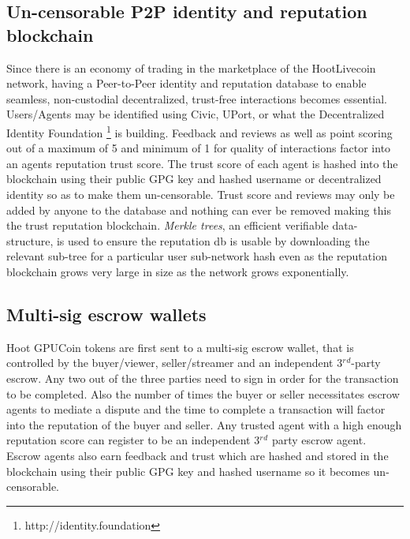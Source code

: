 \documentclass{article}
\begin{document}
\subsection{Un-censorable P2P identity and reputation blockchain}
Since there is an economy of trading in the marketplace of the HootLivecoin network, having a Peer-to-Peer identity and reputation database to enable seamless, non-custodial decentralized, trust-free interactions becomes essential. Users/Agents may be identified using Civic, UPort, or what the Decentralized Identity Foundation \footnote{http://identity.foundation} is building. Feedback and reviews as well as point scoring out of a maximum of 5 and minimum of 1 for quality of interactions factor into an agents reputation trust score. The trust score of each agent is hashed into the blockchain using their public GPG key and hashed username or decentralized identity so as to make them un-censorable. Trust score and reviews may only be added by anyone to the database and nothing can ever be removed making this the trust reputation blockchain. \emph{Merkle trees}, an efficient verifiable data-structure, is used to ensure the reputation db is usable by downloading the relevant sub-tree for a particular user sub-network hash even as the reputation blockchain grows very large in size as the network grows exponentially.

\subsection{Multi-sig escrow wallets}
Hoot GPUCoin tokens are first sent to a multi-sig escrow wallet, that is controlled by the buyer/viewer, seller/streamer and an independent 3$^r$$^d$-party escrow. Any
two out of the three parties need to sign in order for the transaction to be completed. Also the number of times the buyer or seller necessitates escrow agents to mediate a dispute and the time to complete a transaction will factor into the reputation of the buyer and seller. Any trusted agent with a high enough reputation score can register to be an independent 3$^r$$^d$ party escrow agent. Escrow agents also earn feedback and trust which are hashed and stored in the blockchain using their public GPG key and hashed username so it becomes un-censorable.

\fi
\end{document}
